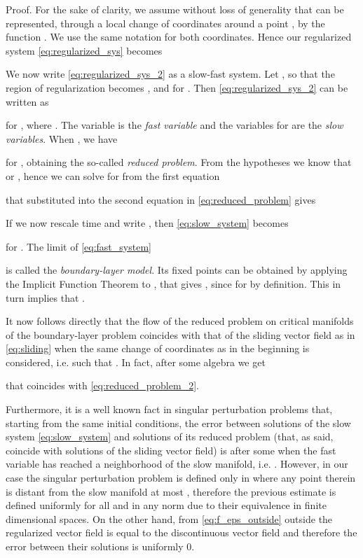 \documentclass[twocolumn]{autart}
\begin{document}
\begin{pf*}{Proof.}
For the sake of clarity, we assume without loss of generality that  can be represented, through a local change of coordinates around a point , by the function . We use the same notation for both coordinates. Hence our regularized system \eqref{eq:regularized_sys} becomes

We now write \eqref{eq:regularized_sys_2} as a slow-fast system. Let , so that the region of regularization becomes , and  for . Then \eqref{eq:regularized_sys_2} can be written as

for , where . The variable  is the {\it fast variable} and the variables  for  are the {\it slow variables}.
When , we have

for , obtaining the so-called \emph{reduced problem}. From the hypotheses we know that  or , hence we can solve for  from the first equation

that substituted into the second equation in \eqref{eq:reduced_problem} gives

If we now rescale time  and write , then \eqref{eq:slow_system} becomes

for . The limit  of \eqref{eq:fast_system}

is called the {\it boundary-layer model}. Its fixed points can be obtained by applying the Implicit Function Theorem to , that gives , since  for  by definition. This in turn implies that .


It now follows directly that the flow of the reduced problem on critical manifolds of the boundary-layer problem coincides with that of the sliding vector field  as in \eqref{eq:sliding} when the same change of coordinates as in the beginning is considered, i.e. such that . In fact, after some algebra we get

that coincides with \eqref{eq:reduced_problem_2}.

Furthermore, it is a well known fact in singular perturbation problems \citep[Theorem 11.1]{khalil1996nonlinear} that, starting from the same initial conditions, the error between solutions   of the slow system \eqref{eq:slow_system} and solutions of its reduced problem (that, as said, coincide with solutions  of the sliding vector field) is  after some  when the fast variable  has reached a  neighborhood of the slow manifold, i.e. . However, in our case the singular perturbation problem is defined only in  where any point therein is distant from the slow manifold at most , therefore the previous estimate is defined uniformly for all  and in any norm due to their equivalence in finite dimensional spaces.
On the other hand, from \eqref{eq:f_eps_outside} outside  the regularized vector field is equal to the discontinuous vector field and therefore the error between their solutions is uniformly 0.
\end{pf*}
\end{document}
